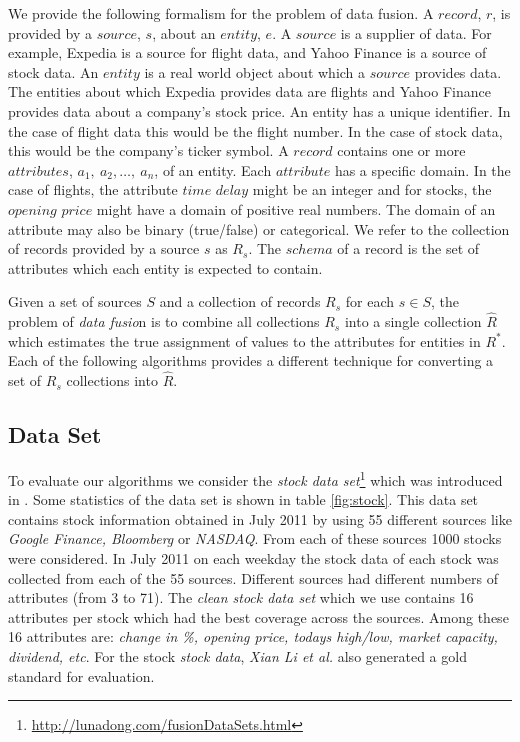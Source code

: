 \documentclass{acm_proc_article-sp}
\begin{document}
We provide the following formalism for the problem of data fusion. A $record$, $r$, is provided by a $source$, $s$, about an $entity$, $e$. A $source$ is a supplier of data. For example, Expedia is a source for flight data, and Yahoo Finance is a source of stock data.  An $entity$ is a real world object about which a $source$ provides data. The entities about which Expedia provides data are flights and Yahoo Finance provides data about a company's stock price. An entity has a unique identifier. In the case of flight data this would be the flight number. In the case of stock data, this would be the company's ticker symbol. A $record$ contains one or more $attributes$, $a_1,\ a_2,\dots,\ a_n$, of an entity. Each $attribute$ has a specific domain. In the case of flights, the attribute $time$ $delay$ might be an integer and for stocks, the $opening$ $price$ might have a domain of positive real numbers.  The domain of an attribute may also be binary (true/false) or categorical. We refer to the collection of records provided by a source $s$ as $R_s$. The $schema$ of a record is the set of attributes which each entity is expected to contain.

Given a set of sources $S$ and a collection of records $R_s$ for each $s \in S$, the problem of \emph{data fusio}n is to combine all collections $R_s$ into a single collection $\hat{R}$ which estimates the true assignment of values to the attributes for entities in $R^*$.  Each of the following algorithms provides a different technique for converting a set of $R_s$ collections into $\hat{R}$. 

\subsection{Data Set}
To evaluate our algorithms we consider the \emph{stock data set}\footnote{\url{http://lunadong.com/fusionDataSets.html}} which was introduced in \cite{li:truth}. Some statistics of the data set is shown in table \ref{fig:stock}. This data set contains stock information obtained in July 2011 by using 55 different sources like \emph{Google Finance, Bloomberg} or \emph{NASDAQ}. From each of these sources 1000 stocks were considered. In July 2011 on each weekday the stock data of each stock was collected from each of the 55 sources. Different sources had different numbers of attributes (from 3 to 71). The \emph{clean stock data set} which we use contains 16 attributes per stock which had the best coverage across the sources. Among these 16 attributes are: \emph{change in \%, opening price, todays high/low, market capacity, dividend, etc}. For the stock \emph{stock data}, \emph{Xian Li et al.} \cite{li:truth} also generated a gold standard for evaluation.
\end{document}
